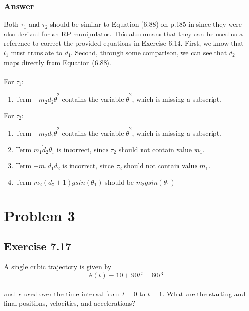\documentclass[10pt]{article}
\begin{document}
\subsubsection*{Answer}
Both \(\tau_{1}\) and \(\tau_{2}\) should be similar to Equation (6.88) on p.185 in \cite{textbook} since they were also derived for an RP manipulator. This also means that they can be used as a reference to correct the provided equations in Exercise 6.14. First, we know that \(l_{1}\) must translate to \(d_{1}\). Second, through some comparison, we can see that \(d_{2}\) maps directly from Equation (6.88). \\ \\
For \(\tau_{1}\):
\begin{enumerate}
\item Term \(- m_{2}d_{2}\dot{\theta}^2\) contains the variable \(\dot{\theta}^2\), which is missing a subscript.
\end{enumerate}
For \(\tau_{2}\):
\begin{enumerate}
\item Term \(- m_{2}d_{2}\dot{\theta}^2\) contains the variable \(\dot{\theta}^2\), which is missing a subscript.
\item Term \(m_{1}\dot{d}_{2}\ddot{\theta}_{1}\) is incorrect, since \(\tau_{2}\) should not contain value \(m_{1}\).
\item Term \(- m_{1}d_{1}\dot{d}_2\) is incorrect, since \(\tau_{2}\) should not contain value \(m_{1}\).
\item Term \(m_{2}(d_{2} + 1)g sin(\theta_{1})\) should be \(m_{2}g sin(\theta_{1})\)
\end{enumerate}
\pagebreak
\section*{Problem 3} %
\subsection*{Exercise 7.17}
A single cubic trajectory is given by \\
\[
\theta(t) = 10 + 90t^2 - 60t^3
\]
\\
and is used over the time interval from \(t = 0\) to \(t = 1\). What are the starting and final positions, velocities, and accelerations?
\end{document}
